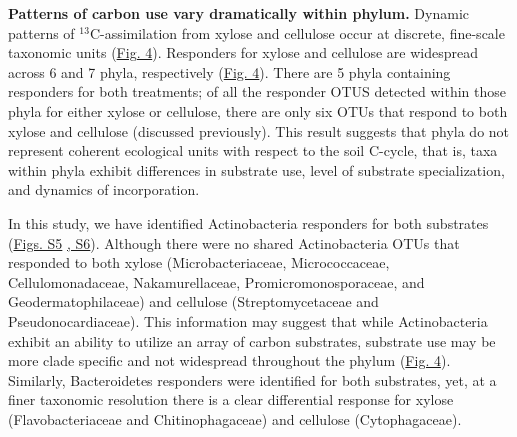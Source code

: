 \textbf{Patterns of carbon use vary dramatically within phylum.} Dynamic
patterns of $^{13}$C-assimilation from xylose and cellulose occur
at discrete, fine-scale taxonomic units
(\href{https://authorea.com/users/3537/articles/3612/master/file/figures/bacteria_tree/bacteria_tree.png}{Fig.
4}). Responders for xylose and cellulose are widespread across 6 and 7 phyla,
respectively
(\href{https://authorea.com/users/3537/articles/3612/master/file/figures/bacteria_tree/bacteria_tree.png}{Fig.
4}). There are 5 phyla containing responders for both treatments; of all the
responder OTUS detected within those phyla for either xylose or cellulose,
there are only six OTUs that respond to both xylose and cellulose (discussed
previously). This result suggests that phyla do not represent coherent
ecological units with respect to the soil C-cycle, that is, taxa within phyla
exhibit differences in substrate use, level of substrate specialization, and
dynamics of incorporation. 

In this study, we have identified Actinobacteria responders for both substrates
(\href{https://authorea.com/users/3537/articles/8459/master/file/figures/xylose_resp_profiles/xylose_resp_profiles.png}{Figs.
S5}
\href{https://authorea.com/users/3537/articles/8459/master/file/figures/cellulose_resp_profiles/cellulose_resp_profiles.png}{,
S6}). Although there were no shared Actinobacteria OTUs that responded to both
xylose (Microbacteriaceae, Micrococcaceae, Cellulomonadaceae, Nakamurellaceae,
Promicromonosporaceae, and Geodermatophilaceae) and cellulose
(Streptomycetaceae and Pseudonocardiaceae). This information may suggest that
while Actinobacteria exhibit an ability to utilize an array of carbon
substrates, substrate use may be more clade specific and not widespread
throughout the phylum
(\href{https://authorea.com/users/3537/articles/3612/master/file/figures/bacteria_tree/bacteria_tree.png}{Fig.
4}). Similarly, Bacteroidetes responders were identified for both substrates,
yet, at a finer taxonomic resolution there is a clear differential response for
xylose (Flavobacteriaceae and Chitinophagaceae) and cellulose (Cytophagaceae). 


